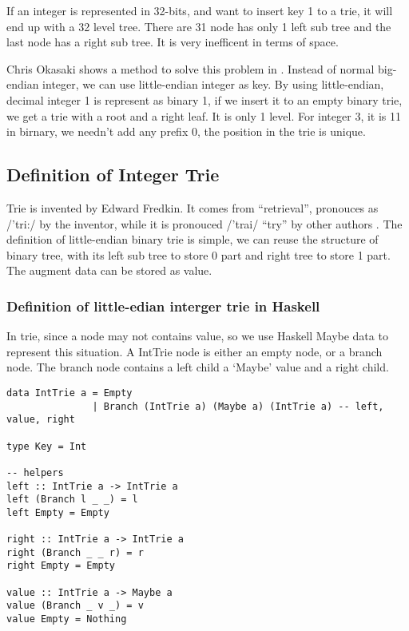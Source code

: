 \documentclass{article}
\begin{document}
If an integer is represented in 32-bits, and want to insert key 1 to a trie, it will end
up with a 32 level tree. There are 31 node has only 1 left sub tree and the last node has
a right sub tree. It is very inefficent in terms of space.

Chris Okasaki shows a method to solve this problem in \cite{okasaki-int-map}. Instead of 
normal big-endian integer, we can use little-endian integer as key. By using little-endian,
decimal integer 1 is represent as binary 1, if we insert it to an empty binary trie, we
get a trie with a root and a right leaf. It is only 1 level. For integer 3, it is 11 in 
birnary, we needn't add any prefix 0, the position in the trie is unique.

\subsection{Definition of Integer Trie}
Trie is invented by Edward Fredkin. It comes from ``retrieval'', pronouces 
as /'tri:/ by the inventor, while it is pronouced /'trai/ ``try'' 
by other authors \cite{wiki-trie}.
The definition of little-endian binary trie is simple, we can reuse the structure
of binary tree, with its left sub tree to store 0 part and right tree to store 1 part.
The augment data can be stored as value.

\subsubsection*{Definition of little-edian interger trie in Haskell}
In trie, since a node may not contains value, so we use Haskell Maybe data to represent
this situation. A IntTrie node is either an empty node, or a branch node. The branch
node contains a left child a `Maybe' value and a right child. 

\lstset{language=Haskell}
\begin{lstlisting}
data IntTrie a = Empty 
               | Branch (IntTrie a) (Maybe a) (IntTrie a) -- left, value, right

type Key = Int

-- helpers
left :: IntTrie a -> IntTrie a
left (Branch l _ _) = l
left Empty = Empty

right :: IntTrie a -> IntTrie a
right (Branch _ _ r) = r
right Empty = Empty

value :: IntTrie a -> Maybe a
value (Branch _ v _) = v
value Empty = Nothing
\end{lstlisting}
\end{document}
